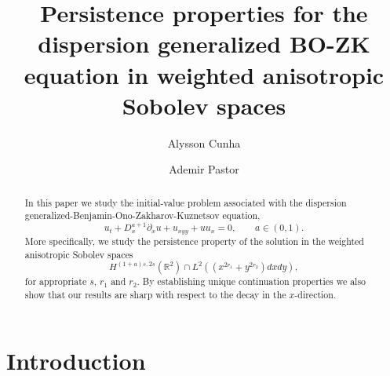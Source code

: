 \documentclass[reqno]{amsart}
\newcommand{\R}{\mathbb R}
\numberwithin{equation}{section}
\begin{document}
\vglue-1cm \hskip1cm
\title[The gBO-ZK equation in weighted spaces]{Persistence properties for the dispersion generalized BO-ZK equation in weighted anisotropic Sobolev spaces}





\author[A. Cunha]{Alysson Cunha}
\address{Instituto de Matem\'atica e Estat\'istica(IME).
Universidade Federal de Goi\'as(UFG), Campus Samambaia, 131, 74001-970, Goi\^ania, Bra\-zil}

\author[A. Pastor]{Ademir Pastor}
\address{IMECC-UNICAMP, Rua S\'ergio Buarque de Holanda, 651, 13083-859, Cam\-pi\-nas-SP, Bra\-zil}






\begin{abstract}
In this paper we study  the initial-value problem associated with the dispersion
generalized-Benjamin-Ono-Zakharov-Kuznetsov equation,
$$
u_{t}+D^{a+1}_x \partial_{x}u+u_{xyy}+uu_{x}=0, \qquad a\in(0,1).
$$
 More specifically, we study the persistence property of the solution  in the weighted anisotropic Sobolev spaces
$$
H^{(1+a)s,2s}(\R^{2})\cap L^{2}((x^{2r_1} +y^{2r_2})dxdy),
$$
for appropriate $s$, $r_1$ and $r_2$. By establishing unique continuation properties we also show that our results are sharp with respect to the decay in the $x$-direction.
\end{abstract}
 
\maketitle

\section{Introduction}\label{introduction}
\end{document}
